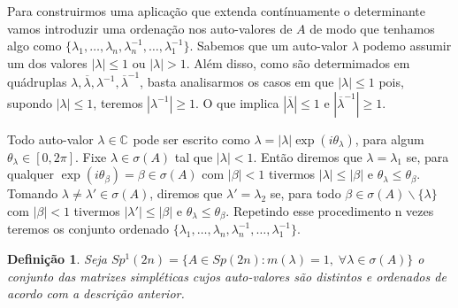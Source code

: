 \documentclass[12pt]{book}
\newtheorem{definicao}[teorema]{Definição}
\newcommand{\complementar}[2]{#1 \backslash #2}
\newcommand{\complexo}[1]{\mathbb{C}^{#1}}
\newcommand{\gruposimpletico}[1]{Sp(#1)}
\newcommand{\gruposimpleticoespecial}[1]{Sp^{1}(#1)}
\begin{document}
	Para construirmos uma aplicação que extenda contínuamente o determinante vamos introduzir uma ordenação nos auto-valores de $A$ de modo que tenhamos algo como $\{\lambda_{1} ,\dots,\lambda_{n},\lambda_{n}^{-1},\dots,\lambda_{1}^{-1} \}$. Sabemos que um auto-valor $\lambda$ podemo assumir um dos valores $|\lambda|\leq 1$ ou $|\lambda|>1$. Além disso, como são determimados em quádruplas $\lambda, \overline{\lambda}, \lambda^{-1}, \overline{\lambda}^{-1}$, basta analisarmos os casos em que $|\lambda| \leq 1$ pois, supondo $|\lambda|\leq 1$, teremos $|\lambda^{-1}|\geq 1$. O que implica $|\overline{\lambda}|\leq 1$ e $|\overline{\lambda}^{-1}|\geq 1$.
	
	Todo auto-valor $\lambda \in \complexo{}$ pode ser escrito como $\lambda = |\lambda|\exp(i\theta_{\lambda})$, para algum $\theta_{\lambda} \in [0,2\pi]$. Fixe $\lambda\in \sigma(A)$ tal que $|\lambda|<1$. Então diremos que $\lambda = \lambda_{1}$ se, para qualquer $\exp(i\theta_{\beta}) = \beta\in \sigma(A)$ com $|\beta|<1$ tivermos $|\lambda|\leq  |\beta|$ e $\theta_{\lambda}\leq \theta_{\beta}$. Tomando $\lambda \neq \lambda'\in \sigma(A)$, diremos que $\lambda' = \lambda_{2}$ se, para todo $\beta \in \complementar{\sigma(A)}{\{\lambda\} }$ com $|\beta|<1$ tivermos $|\lambda'|\leq  |\beta|$ e $\theta_{\lambda}\leq \theta_{\beta}$.  Repetindo esse procedimento n vezes teremos os conjunto ordenado $\{\lambda_{1} ,\dots,\lambda_{n},\lambda_{n}^{-1},\dots,\lambda_{1}^{-1} \}$.
	
	\begin{definicao}
		Seja $\gruposimpleticoespecial{2n} =\{A\in \gruposimpletico{2n} : m(\lambda) = 1,\;\forall \lambda\in \sigma(A) \}$ o conjunto das matrizes simpléticas cujos auto-valores são distintos e ordenados de acordo com a descrição anterior.
	\end{definicao}
	
\end{document}
